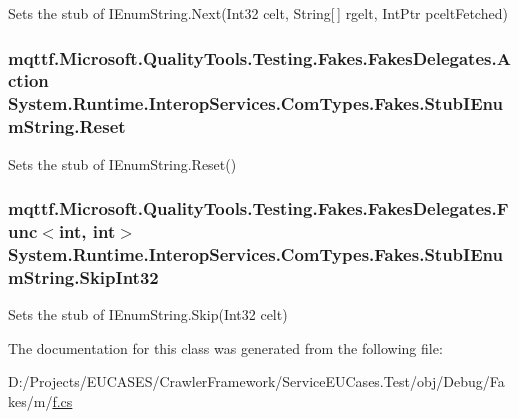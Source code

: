 Sets the stub of I\-Enum\-String.\-Next(\-Int32 celt, String\mbox{[}$\,$\mbox{]} rgelt, Int\-Ptr pcelt\-Fetched)

\hypertarget{class_system_1_1_runtime_1_1_interop_services_1_1_com_types_1_1_fakes_1_1_stub_i_enum_string_a2e92e532abe9785cef4238ac31b8be3e}{
\subsubsection[{Reset}]{\setlength{\rightskip}{0pt plus 5cm}mqttf.\-Microsoft.\-Quality\-Tools.\-Testing.\-Fakes.\-Fakes\-Delegates.\-Action System.\-Runtime.\-Interop\-Services.\-Com\-Types.\-Fakes.\-Stub\-I\-Enum\-String.\-Reset}}\label{class_system_1_1_runtime_1_1_interop_services_1_1_com_types_1_1_fakes_1_1_stub_i_enum_string_a2e92e532abe9785cef4238ac31b8be3e}


Sets the stub of I\-Enum\-String.\-Reset()

\hypertarget{class_system_1_1_runtime_1_1_interop_services_1_1_com_types_1_1_fakes_1_1_stub_i_enum_string_a08a89d1c03b6b62ddb06306112b2044a}{
\subsubsection[{Skip\-Int32}]{\setlength{\rightskip}{0pt plus 5cm}mqttf.\-Microsoft.\-Quality\-Tools.\-Testing.\-Fakes.\-Fakes\-Delegates.\-Func$<$int, int$>$ System.\-Runtime.\-Interop\-Services.\-Com\-Types.\-Fakes.\-Stub\-I\-Enum\-String.\-Skip\-Int32}}\label{class_system_1_1_runtime_1_1_interop_services_1_1_com_types_1_1_fakes_1_1_stub_i_enum_string_a08a89d1c03b6b62ddb06306112b2044a}


Sets the stub of I\-Enum\-String.\-Skip(\-Int32 celt)



The documentation for this class was generated from the following file\-:\begin{DoxyCompactItemize}
\item 
D\-:/\-Projects/\-E\-U\-C\-A\-S\-E\-S/\-Crawler\-Framework/\-Service\-E\-U\-Cases.\-Test/obj/\-Debug/\-Fakes/m/\hyperlink{m_2f_8cs}{f.\-cs}\end{DoxyCompactItemize}
